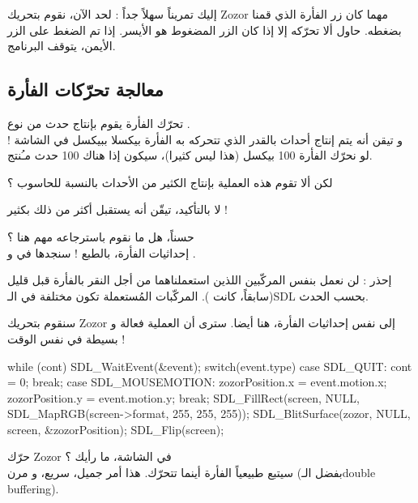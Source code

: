 
إليك تمريناً سهلاً جداً : لحد الآن، نقوم بتحريك
\textenglish{Zozor}
مهما كان زر الفأرة الذي قمنا بضغطه. حاول ألا تحرّكه إلا إذا كان الزر المضغوط هو الأيسر. إذا تم الضغط على الزر الأيمن، يتوقف البرنامج.

\subsection{معالجة تحرّكات الفأرة}

تحرّك الفأرة يقوم بإنتاج حدث من نوع
.\\
و تيقن أنه يتم إنتاج أحداث بالقدر الذي تتحركه به الفأرة بيكسلا ببيكسل في الشاشة ! لو نحرّك الفأرة 100 بيكسل (هذا ليس كثيرا)، سيكون إذا هناك 100 حدث مـُنتج.

\begin{question}
لكن ألا تقوم هذه العملية بإنتاج الكثير من الأحداث بالنسبة للحاسوب ؟
\end{question}

لا بالتأكيد، تيقّن أنه يستقبل أكثر من ذلك بكثير !

حسناً، هل ما نقوم باسترجاعه مهم هنا ؟\\
إحداثيات الفأرة، بالطبع ! سنجدها في
و
.

\begin{warning}
إحذر : لن نعمل بنفس المركّبين اللذين استعملناهما من أجل النقر بالفأرة قبل قليل (سابقاً، كانت
).
المركّبات المُستعملة تكون مختلفة في الـ\textenglish{SDL}
بحسب الحدث.
\end{warning}

سنقوم بتحريك
\textenglish{Zozor}
إلى نفس إحداثيات الفأرة، هنا أيضا. سترى أن العملية فعالة و بسيطة في نفس الوقت !

\begin{Csource}
while (cont)
{
	SDL_WaitEvent(&event);
	switch(event.type)
	{
		case SDL_QUIT:
		cont = 0;
		break;
		case SDL_MOUSEMOTION:
		zozorPosition.x = event.motion.x;
		zozorPosition.y = event.motion.y;
		break;
	}
	SDL_FillRect(screen, NULL, SDL_MapRGB(screen->format, 255, 255, 255));
	SDL_BlitSurface(zozor, NULL, screen, &zozorPosition); 
	SDL_Flip(screen);
}
\end{Csource}

حرّك
\textenglish{Zozor}
في الشاشة، ما رأيك ؟\\
سيتبع طبيعياً الفأرة أينما تتحرّك. هذا أمر جميل، سريع، و مرن (بفضل الـ\textenglish{double buffering}).

